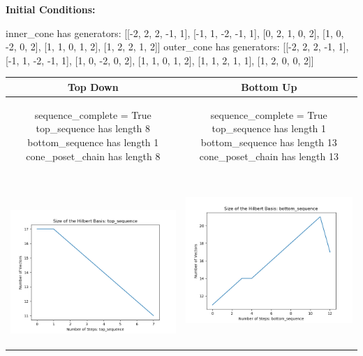 \documentclass[10pt]{article}
\begin{document}
\textbf{Initial Conditions:}
\begin{SAGE}
inner_cone has generators: 
[[-2, 2, 2, -1, 1], [-1, 1, -2, -1, 1], [0, 2, 1, 0, 2], [1, 0, -2, 0, 2], [1, 1, 0, 1, 2], [1, 2, 2, 1, 2]]
outer_cone has generators: 
[[-2, 2, 2, -1, 1], [-1, 1, -2, -1, 1], [1, 0, -2, 0, 2], [1, 1, 0, 1, 2], [1, 1, 2, 1, 1], [1, 2, 0, 0, 2]]

\end{SAGE}
\begin{tabular}{c|c}
\textbf{Top Down} & \textbf{Bottom Up} \\ \hline  
\begin{SAGE}
	sequence_complete = True
	top_sequence has length 8
	bottom_sequence has length 1
	cone_poset_chain has length 8
\end{SAGE} 
&
\begin{SAGE}
	sequence_complete = True
	top_sequence has length 1
	bottom_sequence has length 13
	cone_poset_chain has length 13
\end{SAGE} 
\\ \hline
\
\begin{minipage}{.45\textwidth}
\includegraphics[width=\textwidth]{"DATA/5d/6 generators 2 bound J/top_sequence SIZE"}
\end{minipage} &
\begin{minipage}{.45\textwidth}
\includegraphics[width=\textwidth]{"DATA/5d/6 generators 2 bound J bottomup/bottom_sequence SIZE"}

\end{minipage}
\end{tabular}
\end{document}
